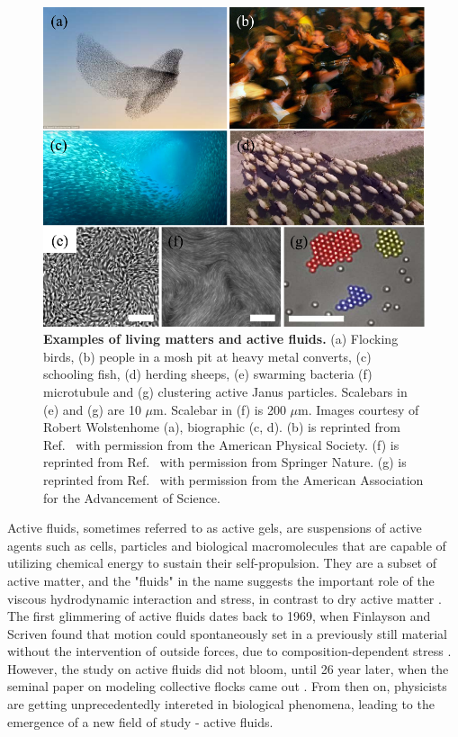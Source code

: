 \begin{figure}[!htbp]
	\begin{center}
	\includegraphics[width=5.5 in]{Figs/1-Intro/1.pdf}
	\end{center}
	\caption[Examples of living matters and active fluids]
	{
	\textbf{Examples of living matters and active fluids.}
  (a) Flocking birds, (b) people in a mosh pit at heavy metal converts, (c) schooling fish, (d) herding sheeps, (e) swarming bacteria (f) microtubule and (g) clustering active Janus particles.
  Scalebars in (e) and (g) are 10 $\mu$m. Scalebar in (f) is 200 $\mu$m. Images courtesy of Robert Wolstenhome (a), biographic (c, d).
  (b) is reprinted from Ref.~\cite{Silverberg2013} with permission from the American Physical Society. (f) is reprinted from Ref.~\cite{DeCamp2015} with permission from
	Springer Nature. (g) is reprinted from Ref.~\cite{Palacci2013} with permission from
	the American Association for the Advancement of Science.
	}
	\label{fig:living-matter-examples}
\end{figure}

Active fluids, sometimes referred to as active gels, are suspensions of active agents such as cells, particles and biological macromolecules that are capable of utilizing chemical energy to sustain their self-propulsion. They are a subset of active matter, and the "fluids" in the name suggests the important role of the viscous hydrodynamic interaction and stress, in contrast to dry active matter \cite{Marchetti2013}. The first glimmering of active fluids dates back to 1969, when Finlayson and Scriven found that motion could spontaneously set in a previously still material without the intervention of outside forces, due to composition-dependent stress \cite{Finlayson1969}. However, the study on active fluids did not bloom, until 26 year later, when the seminal paper on modeling collective flocks came out \cite{Vicsek1995}. From then on, physicists are getting unprecedentedly intereted in biological phenomena, leading to the emergence of a new field of study - active fluids.

